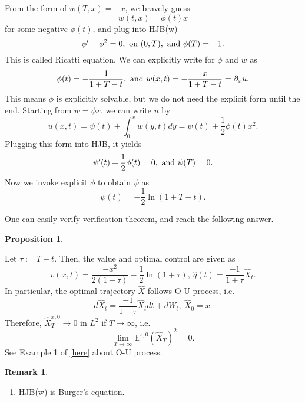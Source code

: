 \documentclass{article}
\newtheorem{proposition}[theorem]{Proposition}
\newtheorem{remark}[theorem]{Remark}
\begin{document}
From the form of $w(T, x) = - x$, we bravely guess $$w(t, x) = \phi(t) x$$ for 
some negative $\phi(t)$, and plug into HJB(w)
$$\phi' + \phi^{2}  = 0, \hbox{ on } (0, T), \hbox{ and } \phi(T) = -1.$$
This is called Ricatti equation. We can explicitly write for $\phi$ and $w$ as
\begin{equation}
 \label{eq:170810-phi}
\phi(t) = - \frac{1}{1 + T -t}, \hbox{ and } w(x, t) = - \frac{x}{1 + T -t } = \partial_{x} u.
\end{equation}
This means $\phi$ is explicitly solvable, 
but we do not need the explicit form until the end. Starting from $w = \phi x$, 
we can write $u$ by
$$u(x, t) = \psi(t) + \int_{0}^{x} w(y, t) dy = \psi(t) + \frac 1 2 \phi(t) x^{2}.$$
Plugging this form into HJB, it yields
$$\psi'(t) + \frac 1 2 \phi(t) = 0, \hbox{ and } \psi(T) = 0.$$
Now we invoke explicit $\phi$ to obtain $\psi$ as
\begin{equation}
 \label{eq:170810-psi}
 \psi(t) = - \frac 1 2 \ln ( 1 + T - t). 
\end{equation}



One can easily verify verification theorem, and reach the following answer.
\begin{proposition}
 
\end{proposition}
Let $\tau:= T - t$. Then, the value and optimal control are given as
$$v(x, t) =  \frac{- x^{2}}{2(1+ \tau)} - \frac 1 2 \ln (1 + \tau), 
\ 
\hat q(t) = \frac{-1}{1+ \tau} \hat X_{t}.$$ 
In particular, the optimal trajectory 
$\hat X$ follows O-U process, i.e. 
$$d \hat X_{t} = \frac{-1}{1+ \tau} \hat X_{t} dt + dW_{t}, \ \hat X_{0} = x.$$
Therefore, $\hat X_{T}^{x, 0} \to 0$ in $L^{2}$ if $T \to \infty$, i.e.
$$\lim_{T\to \infty}  \mathbb E^{x,0} (\hat X_{T})^{2} = 0.$$
See Example 1 of 
\href{https://01law.wordpress.com/2017/07/25/ornstein-uhlenbeck-process/#more-883}{[here]}
about O-U process.

\begin{remark}
 
\end{remark}
\begin{enumerate}
 \item HJB(w) is Burger's equation.
\end{enumerate}
\end{document}
